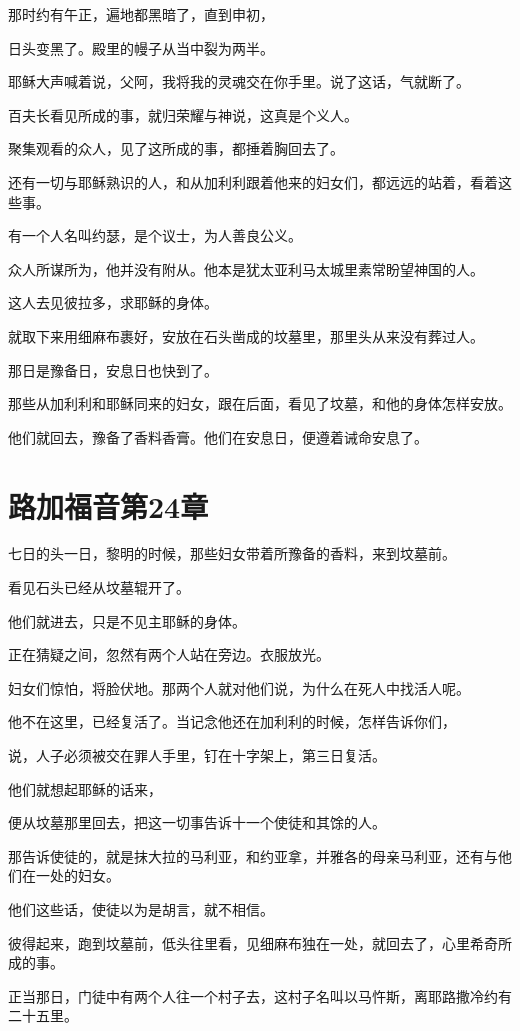 \documentclass[12pt,oneside]{book}
\begin{document}
那时约有午正，遍地都黑暗了，直到申初，

日头变黑了。殿里的幔子从当中裂为两半。

耶稣大声喊着说，父阿，我将我的灵魂交在你手里。说了这话，气就断了。

百夫长看见所成的事，就归荣耀与神说，这真是个义人。

聚集观看的众人，见了这所成的事，都捶着胸回去了。

还有一切与耶稣熟识的人，和从加利利跟着他来的妇女们，都远远的站着，看着这些事。

有一个人名叫约瑟，是个议士，为人善良公义。

众人所谋所为，他并没有附从。他本是犹太亚利马太城里素常盼望神国的人。

这人去见彼拉多，求耶稣的身体。

就取下来用细麻布裹好，安放在石头凿成的坟墓里，那里头从来没有葬过人。

那日是豫备日，安息日也快到了。

那些从加利利和耶稣同来的妇女，跟在后面，看见了坟墓，和他的身体怎样安放。

他们就回去，豫备了香料香膏。他们在安息日，便遵着诫命安息了。

\chapter{路加福音第24章}
七日的头一日，黎明的时候，那些妇女带着所豫备的香料，来到坟墓前。

看见石头已经从坟墓辊开了。

他们就进去，只是不见主耶稣的身体。

正在猜疑之间，忽然有两个人站在旁边。衣服放光。

妇女们惊怕，将脸伏地。那两个人就对他们说，为什么在死人中找活人呢。

他不在这里，已经复活了。当记念他还在加利利的时候，怎样告诉你们，

说，人子必须被交在罪人手里，钉在十字架上，第三日复活。

他们就想起耶稣的话来，

便从坟墓那里回去，把这一切事告诉十一个使徒和其馀的人。

那告诉使徒的，就是抹大拉的马利亚，和约亚拿，并雅各的母亲马利亚，还有与他们在一处的妇女。

他们这些话，使徒以为是胡言，就不相信。

彼得起来，跑到坟墓前，低头往里看，见细麻布独在一处，就回去了，心里希奇所成的事。

正当那日，门徒中有两个人往一个村子去，这村子名叫以马忤斯，离耶路撒冷约有二十五里。
\end{document}
